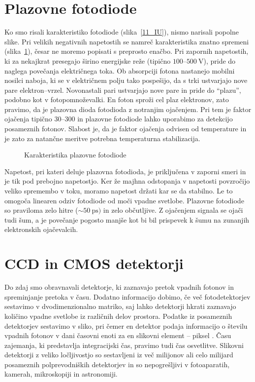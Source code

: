 \section{Plazovne fotodiode}
Ko smo risali karakteristiko fotodiode (slika~\ref{11_IU}), 
nismo narisali popolne slike.
Pri velikih negativnih napetostih se namreč karakteristika znatno spremeni (slika~\ref{11_plaz}), 
česar ne moremo popisati s preprosto enačbo. Pri zapornih napetostih, ki za nekajkrat presegajo 
širino energijske reže (tipično $100$--$500~\si{\volt}$), 
pride do naglega povečanja električnega toka. Ob absorpciji fotona nastanejo mobilni nosilci naboja, ki 
se v električnem polju tako pospešijo, da s trki ustvarjajo nove pare 
elektron--vrzel. Novonastali pari  ustvarjajo nove pare in pride do ``plazu'', podobno kot v 
fotopomnoževalki. En foton  sproži cel plaz elektronov, zato pravimo, da je plazovna dioda
fotodioda z notranjim ojačenjem. Pri tem je faktor ojačenja tipično $30$--$300$ 
in plazovne fotodiode lahko 
uporabimo za detekcijo posameznih fotonov. Slabost je, da je faktor ojačenja odvisen od
temperature in je zato za natančne meritve potrebna temperaturna stabilizacija.
\begin{figure}[h]
\centering
\def\svgwidth{60truemm} 

\caption{Karakteristika plazovne fotodiode}
\label{11_plaz}
\end{figure}

Napetost, pri kateri deluje plazovna fotodioda, je priključena v zaporni smeri 
in je tik pod prebojno napetostjo. Ker že  majhna odstopanja v napetosti povzročijo veliko
spremembo v toku, moramo napetost držati kar se da stabilno. Le to omogoča
linearen odziv fotodiode od moči vpadne svetlobe. Plazovne fotodiode so praviloma zelo hitre 
($\sim 50~\si{\pico\second})$ in zelo občutljive. Z ojačenjem signala se ojači tudi šum, a je 
povečanje pogosto manjše kot bi bil prispevek k šumu na zunanjih elektronskih ojačevalcih. 

\section{CCD in CMOS detektorji}
Do zdaj smo obravnavali detektorje, 
ki zaznavajo pretok vpadnih fotonov in spreminjanje
pretoka v času. Dodatno informacijo dobimo, če več fotodetektorjev sestavimo v 
dvodimenzionalno matriko, saj lahko detektorji hkrati zaznavajo količino vpadne svetlobe 
iz različnih delov prostora. Podatke iz posameznih detektorjev sestavimo v sliko, pri čemer 
en detektor podaja informacijo o številu vpadnih fotonov 
v dani časovni enoti za en slikovni element -- piksel . Času zajemanja, ki
predstavlja integracijski čas, pravimo tudi čas osvetlitve.  
Slikovni detektorji z veliko ločljivostjo so sestavljeni iz 
več milijonov ali celo milijard posameznih polprevodniških detektorjev in so 
nepogrešljivi v fotoaparatih, kamerah, mikroskopiji in astronomiji.

